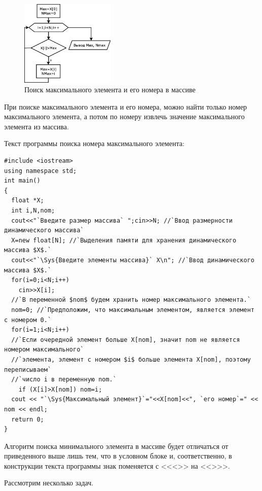 \begin{figure}[htb]
\begin{center}
\includegraphics[width=0.4\textwidth]{img/ris_5_7}
\caption{Поиск максимального элемента и его номера в массиве}
\label{ch05:refDrawing6}
\end{center}
\end{figure}




При поиске максимального элемента и его номера, можно найти только номер максимального элемента, а потом по номеру извлечь
значение максимального элемента из массива.

Текст программы поиска номера максимального элемента:
\begin{lstlisting}
#include <iostream>
using namespace std;
int main()
{
  float *X;
  int i,N,nom;
  cout<<"`Введите размер массива` ";cin>>N; //`Ввод размерности динамического массива`
  X=new float[N]; //`Выделения памяти для хранения динамического массива $X$.`
  cout<<"`\Sys{Введите элементы массива}` X\n"; //`Ввод динамического массива $X$.`
  for(i=0;i<N;i++)
    cin>>X[i];
  //`В переменной $nom$ будем хранить номер максимального элемента.` 
  nom=0; //`Предположим, что максимальным элементом, является элемент с номером 0.`
  for(i=1;i<N;i++)
  //`Если очередной элемент больше X[nom], значит nom не является номером максимального`
  //`элемента, элемент с номером $i$ больше элемента X[nom], поэтому переписываем`
  //`число i в переменную nom.`
    if (X[i]>X[nom]) nom=i;
  cout << "`\Sys{Максимальный элемент}`="<<X[nom]<<", `его номер`=" << nom << endl;
  return 0;
}
\end{lstlisting}

 Алгоритм поиска минимального элемента в массиве будет отличаться от приведенного выше лишь тем, что в
условном блоке и, соответственно, в конструкции  текста программы знак поменяется с <<{<}>> на <<{>}>>.

Рассмотрим несколько задач.


